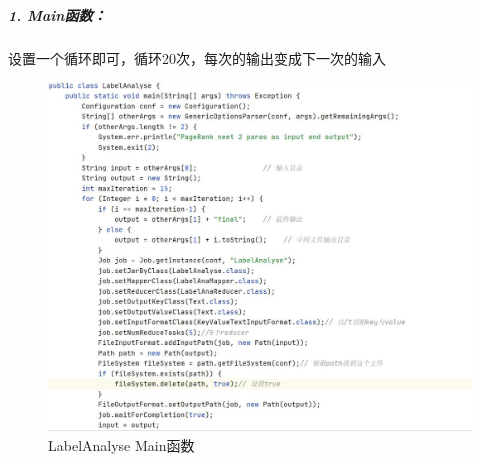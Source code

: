 \documentclass[a4paper,UTF8]{article}
\numberwithin{equation}{section}
\begin{document}
\subparagraph{1. Main函数：}
设置一个循环即可，循环20次，每次的输出变成下一次的输入
\begin{figure}[H]
    \centering

    \includegraphics[width = 15cm]{5-2main.jpg}

    \caption{LabelAnalyse Main函数}
\end{figure}
\end{document}
